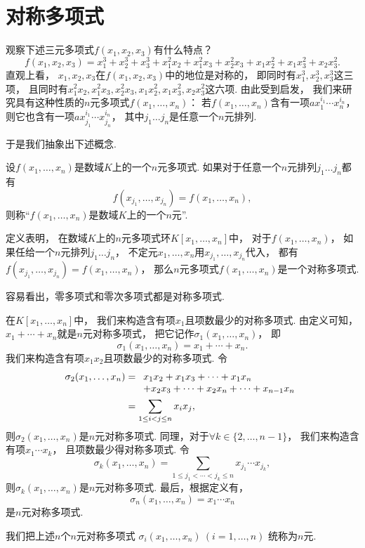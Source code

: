 \section{对称多项式}
观察下述三元多项式\(f(x_1,x_2,x_3)\)有什么特点？
\[
	f(x_1,x_2,x_3)
	=x_1^3+x_2^3+x_3^3
	+x_1^2x_2
	+x_1^2x_3
	+x_2^2x_3
	+x_1x_2^2
	+x_1x_3^2
	+x_2x_3^2.
\]
直观上看，
\(x_1,x_2,x_3\)在\(f(x_1,x_2,x_3)\)中的地位是对称的，
即同时有\(x_1^3,x_2^3,x_3^3\)这三项，
且同时有\(x_1^2x_2,
x_1^2x_3,
x_2^2x_3,
x_1x_2^2,
x_1x_3^2,
x_2x_3^2\)这六项.
由此受到启发，
我们来研究具有这种性质的\(n\)元多项式\(f(x_1,\dotsc,x_n)\)：
若\(f(x_1,\dotsc,x_n)\)含有一项\(a x_1^{i_1} \dotsm x_n^{i_n}\)，
则它也含有一项\(a x_{j_1}^{i_1} \dotsm x_{j_n}^{i_n}\)，
其中\(j_1 \dotso j_n\)是任意一个\(n\)元排列.

于是我们抽象出下述概念.
\begin{definition}
设\(f(x_1,\dotsc,x_n)\)是数域\(K\)上的一个\(n\)元多项式.
如果对于任意一个\(n\)元排列\(j_1 \dotso j_n\)都有\[
	f(x_{j_1},\dotsc,x_{j_n})
	=f(x_1,\dotsc,x_n),
\]
则称“\(f(x_1,\dotsc,x_n)\)是数域\(K\)上的一个\(n\)元”.
\end{definition}

定义表明，
在数域\(K\)上的\(n\)元多项式环\(K[x_1,\dotsc,x_n]\)中，
对于\(f(x_1,\dotsc,x_n)\)，
如果任给一个\(n\)元排列\(j_1 \dotso j_n\)，
不定元\(x_1,\dotsc,x_n\)用\(x_{j_1},\dotsc,x_{j_n}\)代入，
都有\(f(x_{j_1},\dotsc,x_{j_n})=f(x_1,\dotsc,x_n)\)，
那么\(n\)元多项式\(f(x_1,\dotsc,x_n)\)是一个对称多项式.

容易看出，零多项式和零次多项式都是对称多项式.

在\(K[x_1,\dotsc,x_n]\)中，
我们来构造含有项\(x_1\)且项数最少的对称多项式.
由定义可知，
\(x_1+\dotsb+x_n\)就是\(n\)元对称多项式，
把它记作\(\sigma_1(x_1,\dotsc,x_n)\)，
即\[
	\sigma_1(x_1,\dotsc,x_n)
	=x_1+\dotsb+x_n.
\]
我们来构造含有项\(x_1x_2\)且项数最少的对称多项式.
令\begin{align*}
	\sigma_2(x_1,\dotsc,x_n)
	&=\begin{array}[t]{l}
		x_1x_2+x_1x_3+\dotsb+x_1x_n \\
		+x_2x_3+\dotsb+x_2x_n
		+\dotsb
		+x_{n-1}x_n
	\end{array} \\
	&=\sum_{1\leq i<j\leq n} x_i x_j,
\end{align*}
则\(\sigma_2(x_1,\dotsc,x_n)\)是\(n\)元对称多项式.
同理，对于\(\forall k\in\{2,\dotsc,n-1\}\)，
我们来构造含有项\(x_1 \dotsm x_k\)，
且项数最少得对称多项式.
令\[
	\sigma_k(x_1,\dotsc,x_n)
	=\sum_{1\leq j_1<\dotsb<j_k\leq n}
	x_{j_1} \dotsm x_{j_k},
\]
则\(\sigma_k(x_1,\dotsc,x_n)\)是\(n\)元对称多项式.
最后，根据定义有，\[
	\sigma_n(x_1,\dotsc,x_n)
	=x_1 \dotsm x_n
\]是\(n\)元对称多项式.

我们把上述\(n\)个\(n\)元对称多项式
\(\sigma_i(x_1,\dotsc,x_n)\ (i=1,\dotsc,n)\)
统称为\(n\)元.
